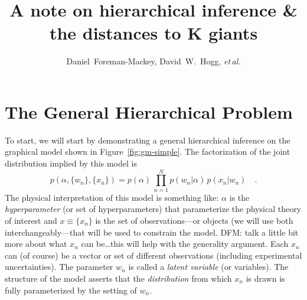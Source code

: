 \documentclass[12pt,preprint]{aastex}
\newcommand{\foreign}[1]{\emph{#1}}
\newcommand{\etal}{\foreign{et\,al.}}
\newcommand{\Fig}[1]{Figure~\ref{fig:#1}}
\newcommand{\fig}[1]{\Fig{#1}}
\newcommand{\pr}[1]{p ( #1 )}
\begin{document}
\title{A note on hierarchical inference \& the distances to K giants}

\author{%
    Daniel~Foreman-Mackey\altaffilmark{\ref{CCPP},\ref{email}}, %
    David~W.~Hogg\altaffilmark{\ref{CCPP},\ref{MPIA}}, %
    \etal%
}

\setcounter{address}{1}

\begin{abstract}
\end{abstract}


\clearpage

\section{The General Hierarchical Problem}

To start, we will start by demonstrating a general hierarchical inference
on the graphical model shown in \fig{gm-simple}. The factorization of the
joint distribution implied by this model is
\begin{equation}
    \pr{\alpha, \{ w_n \}, \{ x_n \}} =
        \pr{\alpha} \, \prod_{n=1}^N \pr{w_n | \alpha} \, \pr{x_n | w_n}
        \quad.
\end{equation}
The physical interpretation of this model is something like: $\alpha$ is the
\emph{hyperparameter} (or set of hyperparameters) that parameterize the
physical theory of interest and $x \equiv \{ x_n \}$ is the set of
observations---or objects (we will use both interchangeably---that will be
used to constrain the model. DFM: talk a little bit more about what $x_n$ can
be\ldots this will help with the generality argument. Each $x_n$ can (of
course) be a vector or set of different observations (including experimental
uncertainties). The parameter $w_n$ is called a \emph{latent variable} (or
variables). The structure of the model asserts that the \emph{distribution}
from which $x_n$ is drawn is fully parameterized by the setting of $w_n$.
\end{document}
